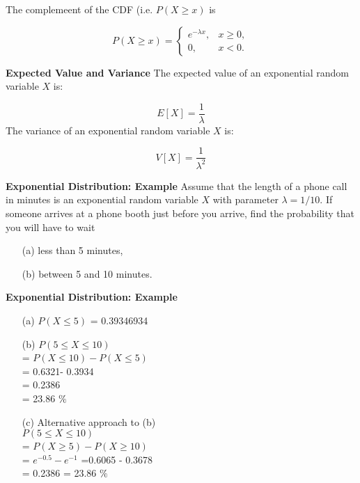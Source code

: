 The complemeent of the CDF (i.e. $P(X \geq x)$ is

\[
P(X \geq x) = \begin{cases}
e^{-\lambda x}, & x \ge 0, \\
0, & x < 0.
\end{cases}\]
\medskip


\textbf{Expected Value and Variance}
The expected value of an exponential random variable $X$ is:

\[
E[X] = \frac{1}{\lambda}\]
The variance of an exponential random variable $X$ is:

\[
V[X] = \frac{1}{\lambda^2}\]

\medskip


\textbf{Exponential Distribution: Example}
Assume that the length of a phone call in minutes is an exponential random variable $X$ with parameter
$\lambda = 1/10$. If someone arrives at a phone booth just before you arrive, find the probability that you
will have to wait \begin{itemize}
\item[(a)] less than 5 minutes,
\item[(b)] between 5 and 10 minutes.
\end{itemize}
\medskip



%


\textbf{Exponential Distribution: Example}

\begin{itemize}
\item[(a)] $P(X \leq 5)$ = 0.39346934
\item[(b)] $P(5 \leq X \leq 10)$ \\ = $P( X \leq 10) - P( X \leq 5)$ \\ = 0.6321- 0.3934 \\ = 0.2386 \\= 23.86 $\%$
\item[(c)] Alternative approach to (b)\\$P(5 \leq X \leq 10)$ \\ = $P( X \geq 5) - P( X \geq 10)$ \\
= $e^{-0.5} - e^{-1}$
=0.6065 - 0.3678\\
= 0.2386 = 23.86 $\%$
\end{itemize}


